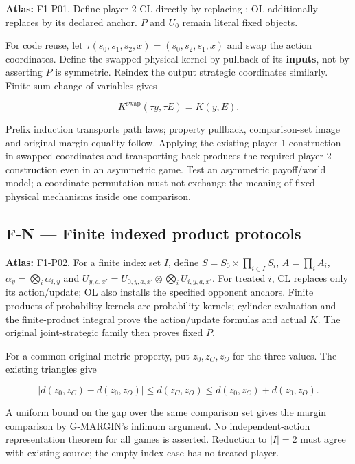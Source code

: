 \documentclass[
  11pt,
  a4paper,
]{article}
\newcommand{\codewrap}[1]{{\ttfamily\seqsplit{#1}}}
\begin{document}
\textbf{Atlas:} F1-P01. Define player-2 CL directly by replacing
\codewrap{G.player2}; OL additionally replaces \codewrap{G.player1} by its
declared anchor. \(P\) and \(U_0\) remain literal fixed objects.

For code reuse, let \(\tau(s_0,s_1,s_2,x)=(s_0,s_2,s_1,x)\) and swap the
action coordinates. Define the swapped physical kernel by pullback of
its \textbf{inputs}, not by asserting \(P\) is symmetric. Reindex the
output strategic coordinates similarly. Finite-sum change of variables
gives

\[K^{\mathrm{swap}}(\tau y,\tau E)=K(y,E).\]

Prefix induction transports path laws; property pullback, comparison-set
image and original margin equality follow. Applying the existing
player-1 construction in swapped coordinates and transporting back
produces the required player-2 construction even in an asymmetric game.
Test an asymmetric payoff/world model; a coordinate permutation must not
exchange the meaning of fixed physical mechanisms inside one comparison.

\subsection{F-N --- Finite indexed product
protocols}\label{f-n-finite-indexed-product-protocols}

\textbf{Atlas:} F1-P02. For a finite index set \(I\), define
\(S=S_0\times\prod_{i\in I}S_i\), \(A=\prod_iA_i\),
\(\alpha_y=\bigotimes_i\alpha_{i,y}\) and
\(U_{y,a,x'}=U_{0,y,a,x'}\otimes\bigotimes_i U_{i,y,a,x'}\). For treated
\(i\), CL replaces only its action/update; OL also installs the
specified opponent anchors. Finite products of probability kernels are
probability kernels; cylinder evaluation and the finite-product integral
prove the action/update formulas and actual \(K\). The original
joint-strategic family then proves fixed \(P\).

For a common original metric property, put \(z_0,z_C,z_O\) for the three
values. The existing triangles give

\[|d(z_0,z_C)-d(z_0,z_O)|\le d(z_C,z_O)
\le d(z_0,z_C)+d(z_0,z_O).\]

A uniform bound on the gap over the same comparison set gives the margin
comparison by G-MARGIN's infimum argument. No independent-action
representation theorem for all games is asserted. Reduction to \(|I|=2\)
must agree with existing source; the empty-index case has no treated
player.
\end{document}
